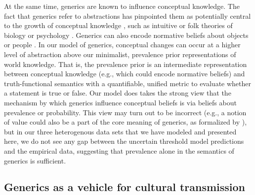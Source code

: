 \documentclass[floatsintext,doc]{apa6}
\begin{document}
At the same time, generics are known to influence conceptual knowledge.
The fact that generics refer to abstractions has pinpointed them as potentially central to the growth of conceptual knowledge \cite{Gelman2003, Gelman2009}, such as intuitive or folk theories of biology or psychology \cite{carey1985conceptual, gopnik1997words}. 
Generics can also encode normative beliefs about objects or people \cite{gockeritz2014young, roberts2017group, orvell2018s}. 
In our model of generics, conceptual changes can occur at a higher level of abstraction above our minimalist, prevalence prior representations of world knowledge. 
That is, the prevalence prior is an intermediate representation between conceptual knowledge (e.g., which could encode normative beliefs) and truth-functional semantics with a quantifiable, unified metric to evaluate whether a statement is true or false. 
Our model does takes the strong view that the mechanism by which generics influence conceptual beliefs is via beliefs about prevalence or probability. 
This view may turn out to be incorrect (e.g., a notion of value could also be a part of the core meaning of generics, as formalized by ), but in our three heterogenous data sets that we have modeled and presented here, we do not see any gap between the uncertain threshold model predictions and the empirical data, suggesting that prevalence alone in the semantics of generics is sufficient.


\subsection{Generics as a vehicle for cultural transmission}
\end{document}
